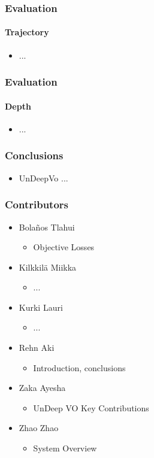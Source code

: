 \documentclass{beamer}
\begin{document}
\begin{frame}
	\frametitle{Evaluation}
    \framesubtitle{Trajectory}
    \begin{itemize}
        \item ...
    \end{itemize}
\end{frame}

\begin{frame}
	\frametitle{Evaluation}
    \framesubtitle{Depth}
    \begin{itemize}
        \item ...
    \end{itemize}
\end{frame}

\begin{frame}
    \frametitle{Conclusions}
    \begin{itemize}
        \item UnDeepVo ...
    \end{itemize}
\end{frame}

\begin{frame}
    \frametitle{Contributors}
    \begin{itemize}
        \item Bola\~nos Tlahui
            \begin{itemize}
                \item Objective Losses
            \end{itemize}
        \item Kilkkilä Miikka
            \begin{itemize}
                \item ...
            \end{itemize}
        \item Kurki Lauri
            \begin{itemize}
                \item ...
            \end{itemize}
        \item Rehn Aki
            \begin{itemize}
                \item Introduction, conclusions
            \end{itemize}
        \item Zaka Ayesha
            \begin{itemize}
                \item UnDeep VO Key Contributions
            \end{itemize}
        \item Zhao Zhao
            \begin{itemize}
                \item System Overview
            \end{itemize}
    \end{itemize}
\end{frame}
\end{document}
